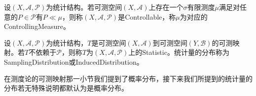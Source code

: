 \begin{definition}
	设$(X,\mathscr{A},\mathscr{P})$为统计结构。若可测空间$(X,\mathscr{A})$上存在一个$\sigma$有限测度$\mu$满足对任意的$P\in\mathscr{P}$有$P\ll\mu$，则称$(X,\mathscr{A},\mathscr{P})$是\gls{Controllable}，称$\mu$为对应的\gls{ControllingMeasure}。
\end{definition}
\begin{definition}
	设$(X,\mathscr{A},\mathscr{P})$为统计结构，$T$是可测空间$(X,\mathscr{A})$到可测空间$(Y,\mathscr{B})$的可测映射。若$T$不依赖于$\mathscr{P}$，则称$T$为$(X,\mathscr{A},\mathscr{P})$上的\gls{Statistic}。统计量的分布称为\gls{SamplingDistribution}或\gls{InducedDistribution}。
\end{definition}
在测度论的可测映射那一小节我们提到了概率分布，接下来我们所提到的统计量的分布若无特殊说明都默认为是概率分布。

